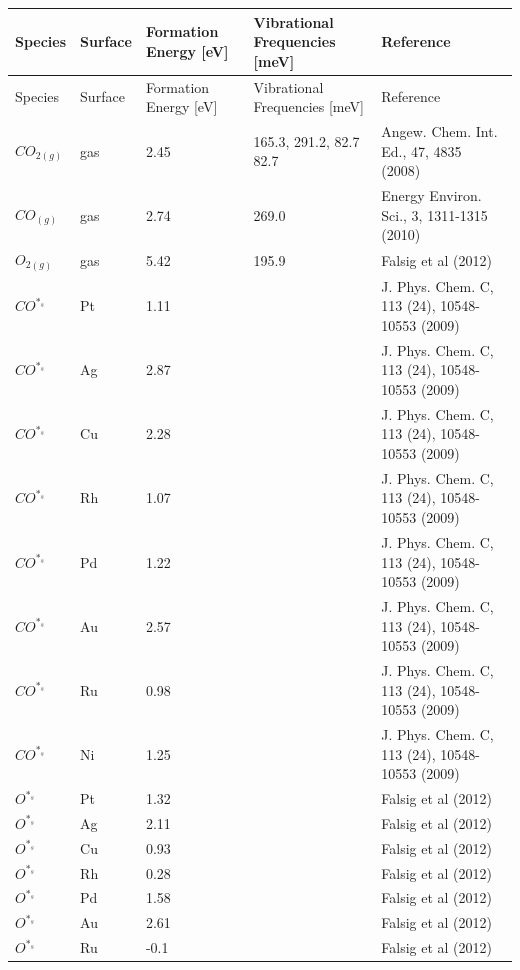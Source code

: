 \documentclass[a4paper,8pt]{report}
\begin{document}
\centering
\begin{longtable}{lllll}
\toprule
Species & Surface & Formation Energy [eV] & Vibrational Frequencies [meV] & Reference \\
\midrule
\endfirsthead
\toprule
Species & Surface & Formation Energy [eV] & Vibrational Frequencies [meV] & Reference \\
\midrule
\endhead
\hline
\endfoot
\hline
\endlastfoot

$CO_{2(g)}$&gas&2.45&\parbox[t]{3cm}{165.3, 291.2, 82.7\\82.7}&\parbox[t]{4cm}{Angew. Chem. Int. Ed., 47, 4835 (2008)}\\
$CO_{(g)}$&gas&2.74&\parbox[t]{3cm}{269.0}&\parbox[t]{4cm}{Energy Environ. Sci., 3, 1311-1315 (2010)}\\
$O_{2(g)}$&gas&5.42&\parbox[t]{3cm}{195.9}&\parbox[t]{4cm}{Falsig et al (2012)}\\
$CO^{*_s}$& Pt& 1.11& & \parbox[t]{4cm}{J. Phys. Chem. C, 113 (24), 10548-10553 (2009)}\\
$CO^{*_s}$& Ag& 2.87& & \parbox[t]{4cm}{J. Phys. Chem. C, 113 (24), 10548-10553 (2009)}\\
$CO^{*_s}$& Cu& 2.28& & \parbox[t]{4cm}{J. Phys. Chem. C, 113 (24), 10548-10553 (2009)}\\
$CO^{*_s}$& Rh& 1.07& & \parbox[t]{4cm}{J. Phys. Chem. C, 113 (24), 10548-10553 (2009)}\\
$CO^{*_s}$& Pd& 1.22& & \parbox[t]{4cm}{J. Phys. Chem. C, 113 (24), 10548-10553 (2009)}\\
$CO^{*_s}$& Au& 2.57& & \parbox[t]{4cm}{J. Phys. Chem. C, 113 (24), 10548-10553 (2009)}\\
$CO^{*_s}$& Ru& 0.98& & \parbox[t]{4cm}{J. Phys. Chem. C, 113 (24), 10548-10553 (2009)}\\
$CO^{*_s}$& Ni& 1.25& & \parbox[t]{4cm}{J. Phys. Chem. C, 113 (24), 10548-10553 (2009)}\\
$O^{*_s}$& Pt& 1.32& & \parbox[t]{4cm}{Falsig et al (2012)}\\
$O^{*_s}$& Ag& 2.11& & \parbox[t]{4cm}{Falsig et al (2012)}\\
$O^{*_s}$& Cu& 0.93& & \parbox[t]{4cm}{Falsig et al (2012)}\\
$O^{*_s}$& Rh& 0.28& & \parbox[t]{4cm}{Falsig et al (2012)}\\
$O^{*_s}$& Pd& 1.58& & \parbox[t]{4cm}{Falsig et al (2012)}\\
$O^{*_s}$& Au& 2.61& & \parbox[t]{4cm}{Falsig et al (2012)}\\
$O^{*_s}$& Ru& -0.1& & \parbox[t]{4cm}{Falsig et al (2012)}\\

\end{longtable}
\end{document}
